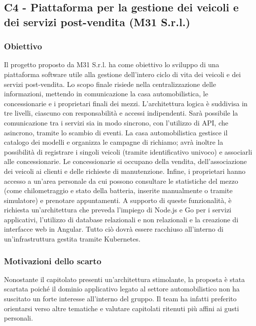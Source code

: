 \documentclass[11pt, a4paper]{article}
\begin{document}
\subsection{C4 - Piattaforma per la gestione dei veicoli e dei servizi post-vendita (M31 S.r.l.)}

\subsubsection{Obiettivo}
Il progetto proposto da M31 S.r.l. ha come obiettivo lo sviluppo di una piattaforma software utile alla gestione dell'intero ciclo di vita dei veicoli e dei servizi post-vendita. Lo scopo finale risiede nella centralizzazione delle informazioni, mettendo in comunicazione la casa automobilistica, le concessionarie e i proprietari finali dei mezzi. \newline
L'architettura logica è suddivisa in tre livelli, ciascuno con responsabilità e accessi indipendenti. Sarà possibile la comunicazione tra i servizi sia in modo sincrono, con l'utilizzo di API, che asincrono, tramite lo scambio di eventi. \newline
La casa automobilistica gestisce il catalogo dei modelli e organizza le campagne di richiamo; avrà inoltre la possibilità di registrare i singoli veicoli (tramite identificativo univoco) e associarli alle concessionarie. Le concessionarie si occupano della vendita, dell'associazione dei veicoli ai clienti e delle richieste di manutenzione. Infine, i proprietari hanno accesso a un'area personale da cui possono consultare le statistiche del mezzo (come chilometraggio e stato della batteria, inserite manualmente o tramite simulatore) e prenotare appuntamenti. \newline
A supporto di queste funzionalità, è richiesta un'architettura che preveda l'impiego di Node.js e Go per i servizi applicativi, l'utilizzo di database relazionali e non relazionali e la creazione di interfacce web in Angular. Tutto ciò dovrà essere racchiuso all'interno di un'infrastruttura gestita tramite Kubernetes.

\subsubsection{Motivazioni dello scarto}
Nonostante il capitolato presenti un'architettura stimolante, la proposta è stata scartata poiché il dominio applicativo legato al settore automobilistico non ha suscitato un forte interesse all'interno del gruppo. Il team ha infatti preferito orientarsi verso altre tematiche e valutare capitolati ritenuti più affini ai gusti personali.
\end{document}
